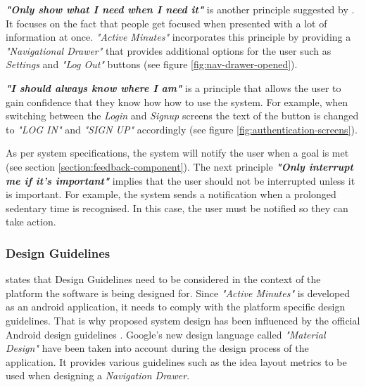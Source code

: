         \textbf{\textit{"Only show what I need when I need it"}} is another principle suggested by \citet{google2017b}. It focuses on the fact that people get focused when presented with a lot of information at once. \textit{"Active Minutes"} incorporates this principle by providing a \textit{"Navigational Drawer"} that provides additional options for the user such as \textit{Settings} and \textit{"Log Out"} buttons (see figure \ref{fig:nav-drawer-opened}). 
        
        \textbf{\textit{"I should always know where I am"}} is a principle that allows the user to gain confidence that they know how how to use the system. For example, when switching between the \textit{Login} and \textit{Signup} screens the text of the button is changed to \textit{"LOG IN"} and \textit{"SIGN UP"} accordingly (see figure \ref{fig:authentication-screens}).
        
        As per system specifications, the system will notify the user when a goal is met (see section \ref{section:feedback-component}). The next principle \textbf{\textit{"Only interrupt me if it's important"}} implies that the user should not be interrupted unless it is important. For example, the system sends a notification when a prolonged sedentary time is recognised. In this case, the user must be notified so they can take action.
        
        \subsubsection{Design Guidelines}
        \citet[57-59]{bell2005} states that Design Guidelines need to be considered in the context of the platform the software is being designed for. Since \textit{"Active Minutes"} is developed as an android application, it needs to comply with the platform specific design guidelines. That is why proposed system design has been influenced by the official Android design guidelines \citep{googleamaterialdesign}. Google's new design language called \textit{"Material Design"} have been taken into account during the design process of the application. It provides various guidelines such as the idea layout metrics to be used when designing a \textit{Navigation Drawer}. 